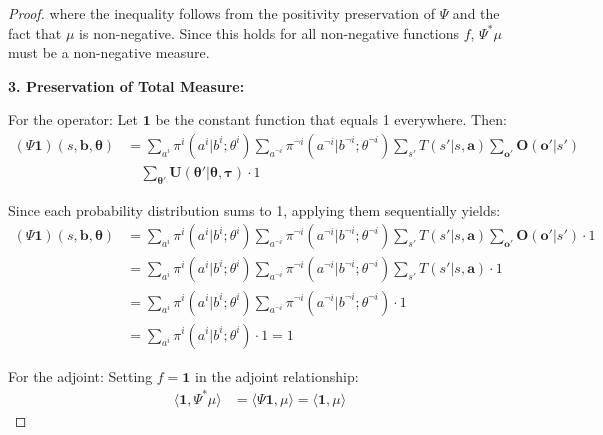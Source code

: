 \documentclass[a4paper,12pt]{report}
\begin{document}
\begin{proof}
    where the inequality follows from the positivity preservation of $\Psi$ and the
    fact that $\mu$ is non-negative. Since this holds for all non-negative
    functions $f$, $\Psi^{*}\mu$ must be a non-negative measure.

    \textbf{3. Preservation of Total Measure:}

    For the operator: Let $\mathbf{1}$ be the constant function that equals 1
    everywhere. Then:
    \begin{align}
        (\Psi \mathbf{1})(s, \boldsymbol{b}, \boldsymbol{\theta}) & = \sum_{a^i}\pi^{i}(a^{i}|b^{i}; \theta^{i}) \sum_{a^{\neg i}}\pi^{\neg i}(a^{\neg i}|b^{\neg i}; \theta^{\neg i}) \sum_{s'}T(s'|s, \boldsymbol{a}) \sum_{\boldsymbol{o}'}\boldsymbol{O}(\boldsymbol{o}'|s') \\
                                                                  & \quad \sum_{\boldsymbol{\theta}'}\boldsymbol{U}(\boldsymbol{\theta}'|\boldsymbol{\theta}, \boldsymbol{\tau}) \cdot 1
    \end{align}

    Since each probability distribution sums to 1, applying them sequentially
    yields:
    \begin{align}
        (\Psi \mathbf{1})(s, \boldsymbol{b}, \boldsymbol{\theta}) & = \sum_{a^i}\pi^{i}(a^{i}|b^{i}; \theta^{i}) \sum_{a^{\neg i}}\pi^{\neg i}(a^{\neg i}|b^{\neg i}; \theta^{\neg i}) \sum_{s'}T(s'|s, \boldsymbol{a}) \sum_{\boldsymbol{o}'}\boldsymbol{O}(\boldsymbol{o}'|s') \cdot 1 \\
                                                                  & = \sum_{a^i}\pi^{i}(a^{i}|b^{i}; \theta^{i}) \sum_{a^{\neg i}}\pi^{\neg i}(a^{\neg i}|b^{\neg i}; \theta^{\neg i}) \sum_{s'}T(s'|s, \boldsymbol{a}) \cdot 1                                                          \\
                                                                  & = \sum_{a^i}\pi^{i}(a^{i}|b^{i}; \theta^{i}) \sum_{a^{\neg i}}\pi^{\neg i}(a^{\neg i}|b^{\neg i}; \theta^{\neg i}) \cdot 1                                                                                           \\
                                                                  & = \sum_{a^i}\pi^{i}(a^{i}|b^{i}; \theta^{i}) \cdot 1 = 1
    \end{align}

    For the adjoint: Setting $f = \mathbf{1}$ in the adjoint relationship:
    \begin{align}
        \langle \mathbf{1}, \Psi^{*}\mu \rangle & = \langle \Psi \mathbf{1}, \mu \rangle = \langle \mathbf{1}, \mu \rangle
    \end{align}


\end{proof}
\end{document}
